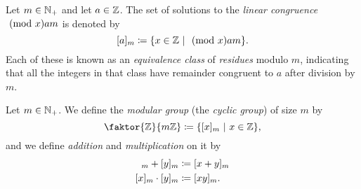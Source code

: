 \begin{definition}
    Let $m \in \mathbb{N}_+$ and let $a \in \mathbb{Z}$.
    The set of solutions to the \emph{linear congruence} $\modulo{x}{a}{m}$ is denoted by
    \[
        [a]_m \defn \set*{x \in \Z \suchthat \modulo{x}{a}{m}}.
    \]
    Each of these is known as an \emph{equivalence class} of \emph{residues} modulo $m$,
    indicating that all the integers in that class have remainder congruent to $a$
    after division by $m$.
\end{definition}

\begin{definition}
    Let $m \in \mathbb{N}_+$.
    We define the \emph{modular group} (\aka the \emph{cyclic group}) of size $m$ by
    \[
        \faktor{\Z}{m\Z} \defn \set*{[x]_m \suchthat x \in \Z},
    \]
    and we define \emph{addition}
    and \emph{multiplication}
    on it by
    \begin{align*}
        [x]_m + [y]_m &\defn [x + y]_m \\
        [x]_m \cdot [y]_m &\defn [xy]_m.
    \end{align*}
\end{definition}



